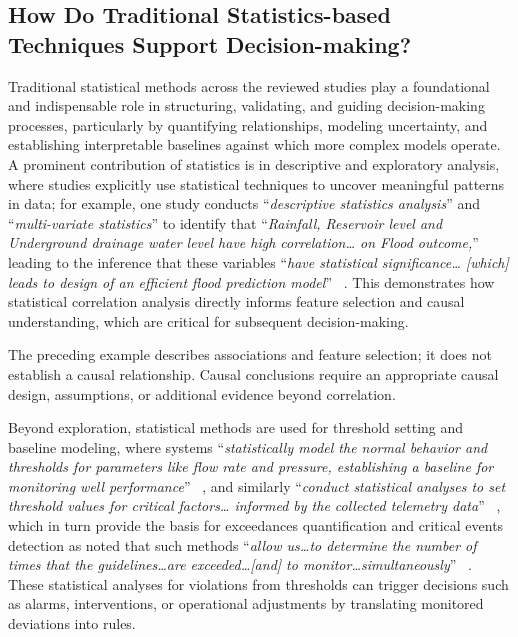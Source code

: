 \documentclass{sfuthesis}
\begin{document}
\subsection{How Do Traditional Statistics-based Techniques Support Decision-making?}
Traditional statistical methods across the reviewed studies play a foundational and indispensable role in structuring, validating, and guiding decision-making processes, particularly by quantifying relationships, modeling uncertainty, and establishing interpretable baselines against which more complex models operate. A prominent contribution of statistics is in descriptive and exploratory analysis, where studies explicitly use statistical techniques to uncover meaningful patterns in data; for example, one study conducts “\textit{descriptive statistics analysis}” and “\textit{multi-variate statistics}” to identify that “\textit{Rainfall, Reservoir level and Underground drainage water level have high correlation… on Flood outcome,}” leading to the inference that these variables “\textit{have statistical significance… [which] leads to design of an efficient flood prediction model}” ~\cite{sreepathy2023design}. This demonstrates how statistical correlation analysis directly informs feature selection and causal understanding, which are critical for subsequent decision-making.\par
The preceding example describes associations and feature selection; it does not establish a causal relationship. Causal conclusions require an appropriate causal design, assumptions, or additional evidence beyond correlation.\par
Beyond exploration, statistical methods are used for threshold setting and baseline modeling, where systems “\textit{statistically model the normal behavior and thresholds for parameters like flow rate and pressure, establishing a baseline for monitoring well performance}” ~\cite{ataei2024intelligent}, and similarly “\textit{conduct statistical analyses to set threshold values for critical factors… informed by the collected telemetry data}” ~\cite{ataei2024intelligent}, which in turn provide the basis for exceedances quantification and critical events detection as noted that such methods “\textit{allow us…to determine the number of times that the guidelines…are exceeded…[and] to monitor…simultaneously}” ~\cite{cavieres_methodology_2020}. These statistical analyses for violations from thresholds can trigger decisions such as alarms, interventions, or operational adjustments by translating monitored deviations into rules.\par
\end{document}
